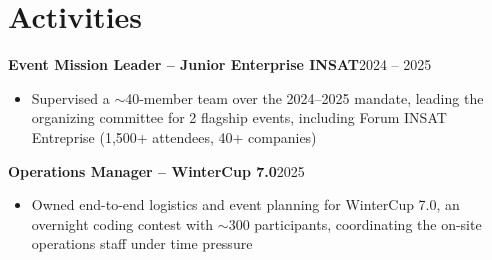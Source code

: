 \documentclass[10pt,a4paper]{article}
\newcommand{\entry}[2]{\vspace{1pt}\noindent\textbf{#1}\hfill{\color{muted}#2}\par}
\begin{document}
\section{Activities}
\entry{Event Mission Leader -- Junior Enterprise INSAT}{2024 -- 2025}
\begin{itemize}
  \item Supervised a $\sim$40-member team over the 2024--2025 mandate, leading the organizing committee for 2 flagship events, including Forum INSAT Entreprise (1,500+ attendees, 40+ companies)
\end{itemize}
\entry{Operations Manager -- WinterCup 7.0}{2025}
\begin{itemize}
  \item Owned end-to-end logistics and event planning for WinterCup 7.0, an overnight coding contest with $\sim$300 participants, coordinating the on-site operations staff under time pressure
\end{itemize}
\end{document}
